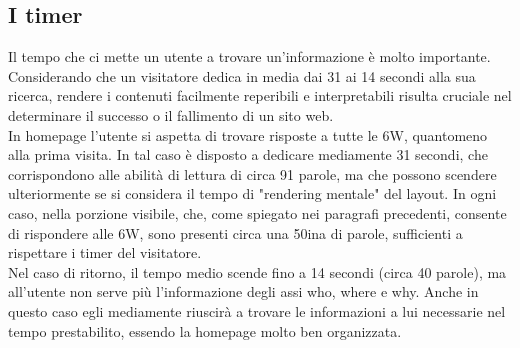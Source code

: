 \subsection{I timer}
Il tempo che ci mette un utente a trovare un'informazione è molto importante. Considerando che un visitatore dedica in media dai 31 ai 14 secondi alla sua ricerca, rendere i contenuti facilmente reperibili e interpretabili risulta cruciale nel determinare il successo o il fallimento di un sito web.\\
In homepage l'utente si aspetta di trovare risposte a tutte le 6W, quantomeno alla prima visita. In tal caso è disposto a dedicare mediamente 31 secondi, che corrispondono alle abilità di lettura di circa 91 parole, ma che possono scendere ulteriormente se si considera il tempo di "rendering mentale" del layout. In ogni caso, nella porzione visibile, che, come spiegato nei paragrafi precedenti, consente di rispondere alle 6W, sono presenti circa una 50ina di parole, sufficienti a rispettare i timer del visitatore.\\
Nel caso di ritorno, il tempo medio scende fino a 14 secondi (circa 40 parole), ma all'utente non serve più l'informazione degli assi who, where e why. Anche in questo caso egli mediamente riuscirà a trovare le informazioni a lui necessarie nel tempo prestabilito, essendo la homepage molto ben organizzata.